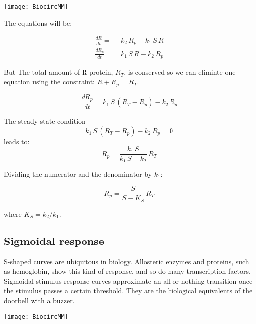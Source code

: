 \begin{marginfigure}
	\begin{center}
		\texttt{[image: BiocircMM]}
	\end{center}
	\caption{ ... }
	\label{fig:bcsat}
\end{marginfigure}

The equations will be:

\begin{align}
	\frac{dR}{dt} =\:& k_2 \, R_p - k_1 \, S \, R\\
	\frac{dR_p}{dt} =\:& k_1 \, S \, R - k_2 \, R_p	
\end{align}

But The total amount of R protein, $R_T$, is conserved so we can eliminte one equation using the constraint: $R + R_p =R_T$. 

\begin{equation}
	\frac{dR_p}{dt}= k_1 \, S \, \left( R_T-R_p \right ) - k_2 \, R_p
\end{equation}

The steady state condition
\begin{equation}
	k_1 \, S \, \left( R_T-R_p \right ) - k_2 \, R_p = 0
\end{equation}
leads to:
\begin{equation}
	R_p = \frac{k_1 \, S }{k_1 \, S  - k_2} \,  R_T
\end{equation}

Dividing the numerator and the denominator by $k_1$:

\begin{equation}
	R_p = \frac{S}{S  - K_S} \,  R_T
\end{equation}

where $K_S = k_2 / k_1$.

\subsection{Sigmoidal response}
S-shaped curves are ubiquitous in biology. Allosteric enzymes and proteins, such as hemoglobin, show this kind of response, and so do many transcription factors. Sigmoidal stimulus-response curves approximate an all or nothing transition once the stimulus passes a certain threshold. They are the biological equivalents of the doorbell with a buzzer.

\begin{marginfigure}
	\begin{center}
		\texttt{[image: BiocircMM]}
	\end{center}
	\caption{ ... }
	\label{fig:bcsigmoid}
\end{marginfigure}


